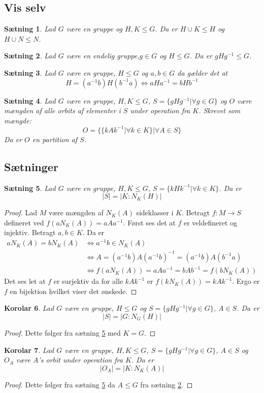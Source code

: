 \documentclass{article}
\newcommand{\inv}{^{-1}}
\newcommand{\biimp}{\Leftrightarrow}
\newcommand{\too}{\rightarrow}
\newtheorem{setn}{Sætning}
\newtheorem{koro}[setn]{Korolar}
\begin{document}
		\subsection*{Vis selv}
		\begin{setn}
			Lad $G$ være en gruppe og $H,K \le G$. Da er $H\cup K \le H$ og $H\cup N \le N$.
		\end{setn}
		\begin{setn} \label{KonjGrup}
			Lad $G$ være en endelig gruppe,$g \in G$ og $H \le G$. Da er $gHg\inv \le G$.
		\end{setn}
		\begin{setn}
			Lad $G$ være en gruppe, $H \le G$ og $a,b \in G$ da gælder det at
			$$H=(a\inv b)H(b\inv a) \biimp aHa\inv = bHb\inv$$
		\end{setn}
		\begin{setn}
			Lad $G$ være en gruppe, $H,K \le G$, $S = \{gHg\inv| \forall g \in G\}$
			og $O$ være mængden af alle orbits af elementer i $S$ under operation fra $K$.
			Skrevet som mængde:
			$$O = \{\{kAk\inv| \forall k \in K\}| \forall A \in S\}$$
			Da er $O$ en partition af $S$.
		\end{setn}
		\subsection*{Sætninger}
		\begin{setn} \label{OrbStøL}
			Lad $G$ være en gruppe, $H,K \le G$, $S = \{kHk\inv| \forall k \in K\}$. Da er
			$$|S| = |K:N_K(H)|$$
		\end{setn}
		\begin{proof}
			Lad $M$ være mængden af $N_K(A)$ sideklasser i $K$.
			Betragt $f:M \too S$ defineret ved $f(aN_K(A)) = aAa\inv$.
			Først ses det at $f$ er veldefineret og injektiv. Betragt $a,b \in K$. Da er
			\begin{align*}
				aN_K(A) = bN_K(A) &\biimp a\inv b \in N_K(A) \\
				&\biimp A = (a\inv b)A(a\inv b)\inv = (a\inv b)A(b\inv a) \\
				&\biimp f(aN_K(A)) = aAa\inv = bAb\inv = f(bN_K(A))
			\end{align*}
			Det ses let at $f$ er surjektiv da for alle $kAk\inv$ er $f(kN_K(A)) = kAk\inv$.
			Ergo er $f$ en bijektion hvilket viser det ønskede.
		\end{proof}
		\begin{koro} \label{ConjTal}
			Lad $G$ være en gruppe, $H \le G$ og $S = \{gHg\inv| \forall g \in G\}$, $A \in S$.
			Da er
			$$|S| = |G:N_G(H)|$$
		\end{koro}
		\begin{proof}
			Dette følger fra sætning \ref{OrbStøL} med $K = G$.
		\end{proof}
		\begin{koro} \label{OrbStø}
			Lad $G$ være en gruppe, $H,K \le G$, $S = \{gHg\inv| \forall g \in G\}$, $A \in S$
			og $O_A$ være $A$'s orbit under operation fra $K$. Da er
			$$|O_A| = |K:N_K(A)|$$
		\end{koro}
		\begin{proof}
			Dette følger fra sætning \ref{OrbStøL} da $A \le G$ fra sætning \ref{KonjGrup}.
		\end{proof}
		\newpage
\end{document}
